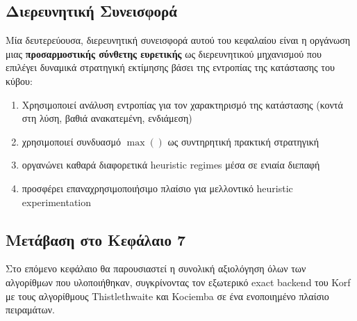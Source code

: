 \subsection{Διερευνητική Συνεισφορά}

Μία δευτερεύουσα, διερευνητική συνεισφορά αυτού του κεφαλαίου είναι η οργάνωση μιας
\textbf{προσαρμοστικής σύνθετης ευρετικής} ως διερευνητικού μηχανισμού που
επιλέγει δυναμικά στρατηγική εκτίμησης βάσει της εντροπίας της κατάστασης του
κύβου:

\begin{enumerate}
    \item Χρησιμοποιεί ανάλυση εντροπίας για τον χαρακτηρισμό της κατάστασης (κοντά στη λύση, βαθιά ανακατεμένη, ενδιάμεση)
    \item χρησιμοποιεί συνδυασμό $\max()$ ως συντηρητική πρακτική στρατηγική
    \item οργανώνει καθαρά διαφορετικά heuristic regimes μέσα σε ενιαία διεπαφή
    \item προσφέρει επαναχρησιμοποιήσιμο πλαίσιο για μελλοντικό heuristic experimentation
\end{enumerate}

\subsection{Μετάβαση στο Κεφάλαιο 7}

Στο επόμενο κεφάλαιο θα παρουσιαστεί η συνολική αξιολόγηση όλων των αλγορίθμων που υλοποιήθηκαν, συγκρίνοντας τον εξωτερικό exact backend του Korf με τους αλγορίθμους Thistlethwaite και Kociemba σε ένα ενοποιημένο πλαίσιο πειραμάτων.
